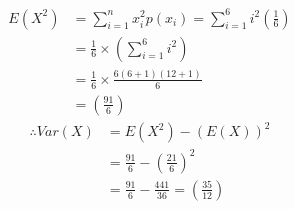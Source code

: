 \documentclass{beamer}
\providecommand{\brak}[1]{\ensuremath{\left(#1\right)}}
\begin{document}
        \begin{frame}
            \begin{align}
             E(X^{2}) &=  \sum_{i=1}^{n} x_{i}^{2}p(x_{i})=\sum_{i=1}^{6} i^{2}  \brak{{\frac{1}{6}}}\\
                      &= \frac{1}{6} \times \brak{\sum_{i=1}^{6} i^{2}}\\
                      &= \frac{1}{6} \times \frac{6(6+1)(12+1)}{6}\\
                      &= \brak{\frac{91}{6}}
             \end{align}
             \begin{align}
             \therefore Var(X) &= E(X^{2})-(E(X))^{2}\\
                          &=\frac{91}{6}-\brak{\frac{21}{6}}^{2}\\
                          &=\frac{91}{6} - \frac{441}{36} = \brak{\frac{35}{12}} 
            \end{align}
        \end{frame}
\end{document}
